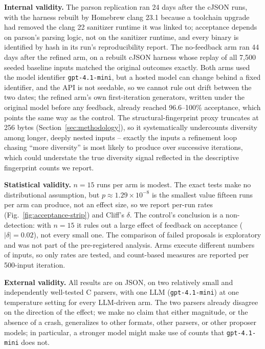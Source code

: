 \textbf{Internal validity.} The parson replication ran 24 days after the
cJSON runs, with the harness rebuilt by Homebrew clang 23.1 because a
toolchain upgrade had removed the clang 22 sanitizer runtime it was linked to;
acceptance depends on parson's parsing logic, not on the sanitizer runtime,
and every binary is identified by hash in its run's reproducibility report.
The no-feedback arm ran 44 days after the refined arm, on a rebuilt cJSON
harness whose replay of all 7{,}500 seeded baseline inputs matched the
original outcomes exactly. Both arms used the model identifier
\texttt{gpt-4.1-mini}, but a hosted model can change behind a fixed
identifier, and the API is not seedable, so we cannot rule out drift between
the two dates; the refined arm's own first-iteration generators, written
under the original model before any feedback, already reached 96.6--100\%
acceptance, which points the same way as the control.
The structural-fingerprint proxy truncates at
256 bytes (Section~\ref{sec:methodology}), so it systematically undercounts
diversity among longer, deeply nested inputs -- exactly the inputs a
refinement loop chasing ``more diversity'' is most likely to produce over
successive iterations, which could understate the true diversity signal
reflected in the descriptive fingerprint counts we report.

\textbf{Statistical validity.} $n{=}15$ runs per arm is modest. The exact
tests make no distributional assumption, but $p \approx 1.29\times10^{-8}$
is the smallest value fifteen runs per arm can produce, not an effect size,
so we report per-run rates (Fig.~\ref{fig:acceptance-strip}) and Cliff's
$\delta$. The control's conclusion is a non-detection: with $n{=}15$ it rules
out a large effect of feedback on acceptance ($|\delta| = 0.02$), not every
small one. The comparison of failed proposals is exploratory and was not
part of the pre-registered analysis. Arms execute different numbers of
inputs, so only rates are tested, and count-based measures are reported
per 500-input iteration.

\textbf{External validity.} All results are on JSON, on two relatively
small and independently well-tested C parsers, with one LLM
(\texttt{gpt-4.1-mini}) at one temperature setting for every LLM-driven
arm. The two parsers already disagree on the direction of the effect; we make
no claim that either magnitude, or the absence of a crash, generalizes to
other formats, other parsers, or other proposer models; in particular, a
stronger model might make use of counts that \texttt{gpt-4.1-mini} does
not.


